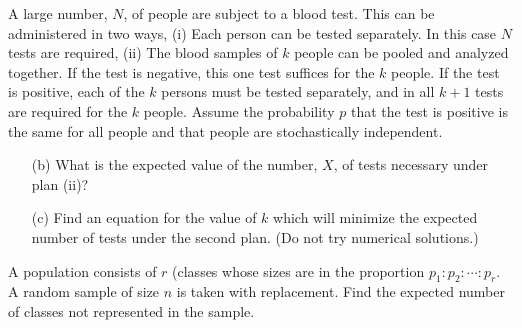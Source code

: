 \begin{problem}
  A large number, \(N\), of people are subject to a blood test. This can be
  administered in two ways, (i) Each person can be tested separately. In
  this case \(N\) tests are required, (ii) The blood samples of \(k\)
  people can be pooled and analyzed together. If the test is negative, this
  one test suffices for the \(k\) people. If the test is positive, each of
  the \(k\) persons must be tested separately, and in all \(k+1\) tests are
  required for the \(k\) people. Assume the probability \(p\) that the test
  is positive is the same for all people and that people are stochastically
  independent.
  \begin{itemize}[noitemsep]
  \item[(b)] What is the expected value of the number, \(X\), of tests
    necessary under plan (ii)?
  \item[(c)] Find an equation for the value of \(k\) which will minimize
    the expected number of tests under the second plan. (Do not try
    numerical solutions.)
  \end{itemize}
\end{problem}
\begin{solution*}
\end{solution*}

\begin{problem}
  A population consists of \(r\) (classes whose sizes are in the proportion
  \(p_1:p_2:\dotsb:p_r\). A random sample of size \(n\) is taken with
  replacement. Find the expected number of classes not represented in the
  sample.
\end{problem}
\begin{solution*}
\end{solution*}

